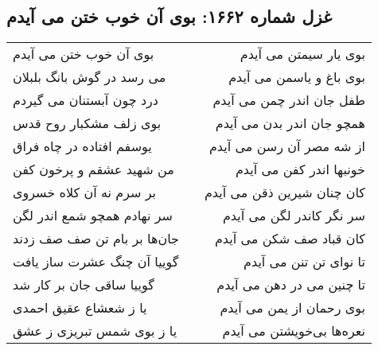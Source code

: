 \begin{center}
\section*{غزل شماره ۱۶۶۲: بوی آن خوب ختن می آیدم}
\label{sec:1662}
\begin{longtable}{l p{0.5cm} r}
بوی آن خوب ختن می آیدم
&&
بوی یار سیمتن می آیدم
\\
می رسد در گوش بانگ بلبلان
&&
بوی باغ و یاسمن می آیدم
\\
درد چون آبستنان می گیردم
&&
طفل جان اندر چمن می آیدم
\\
بوی زلف مشکبار روح قدس
&&
همچو جان اندر بدن می آیدم
\\
یوسفم افتاده در چاه فراق
&&
از شه مصر آن رسن می آیدم
\\
من شهید عشقم و پرخون کفن
&&
خونبها اندر کفن می آیدم
\\
بر سرم نه آن کلاه خسروی
&&
کان چنان شیرین ذقن می آیدم
\\
سر نهادم همچو شمع اندر لگن
&&
سر نگر کاندر لگن می آیدم
\\
جان‌ها بر بام تن صف صف زدند
&&
کان قباد صف شکن می آیدم
\\
گوییا آن چنگ عشرت ساز یافت
&&
تا نوای تن تنن می آیدم
\\
گوییا ساقی جان بر کار شد
&&
تا چنین می در دهن می آیدم
\\
یا ز شعشاع عقیق احمدی
&&
بوی رحمان از یمن می آیدم
\\
یا ز بوی شمس تبریزی ز عشق
&&
نعره‌ها بی‌خویشتن می آیدم
\\
\end{longtable}
\end{center}
